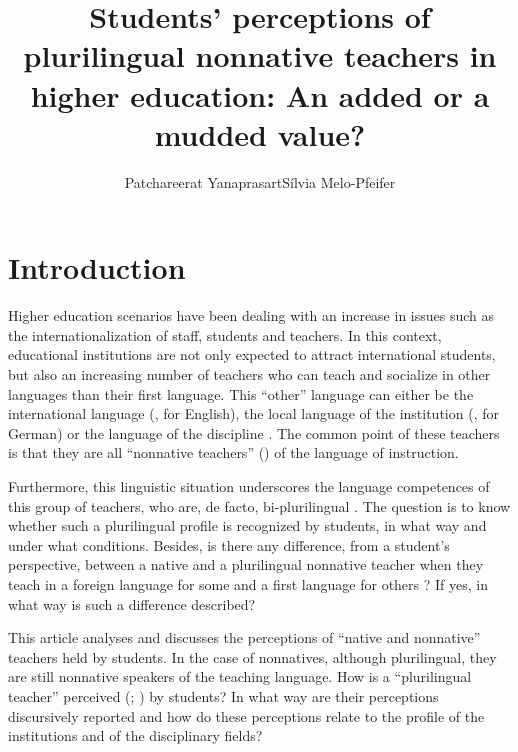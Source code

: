 \documentclass[output=paper]{../langscibook}
\author{Patchareerat Yanaprasart\affiliation{University of Geneva}\orcid{}\lastand Sílvia Melo-Pfeifer \affiliation{University of Hamburg}}
\title{Students’ perceptions of plurilingual nonnative teachers in higher education: An added or a mudded value?}
\begin{document}
\maketitle
{}%




\section{Introduction}

Higher education scenarios have been dealing with an increase in issues such as the internationalization of staff, students and teachers. In this context, educational institutions are not only expected to attract international students, but also an increasing number of teachers who can teach and socialize in other languages than their first language. This “other” language can either be the international language (\citealt{Mueller2018}, for English), the local language of the institution (\citealt{Melo-Pfeifer2017}, for German) or the language of the discipline \citep{Yanaprasart2019}. The common point of these teachers is that they are all “nonnative teachers” (\citealt{DervinBadrinathan2011}) of the language of instruction.

Furthermore, this linguistic situation underscores the language competences of this group of teachers, who are, de facto, bi-plurilingual \citep{Mueller2018}. The question is to know whether such a plurilingual profile is recognized by students, in what way and under what conditions. Besides, is there any difference, from a student’s perspective, between a native and a plurilingual nonnative teacher when they teach in a foreign language for some and a first language for others \citep{Taillefer2004}? If yes, in what way is such a difference described? 

This article analyses and discusses the perceptions of “native and nonnative” teachers held by students. In the case of nonnatives, although plurilingual, they are still nonnative speakers of the teaching language. How is a “plurilingual teacher” perceived (\citealt{Llurda2005}; \citealt{VargheseEtAl2005}) by students? In what way are their perceptions discursively reported \citep{Miller2010} and how do these perceptions relate to the profile of the institutions and of the disciplinary fields?
\end{document}
